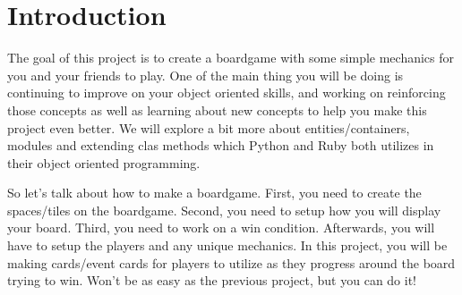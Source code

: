 \documentclass{42-en}
\begin{document}

\chapter{Introduction}

	The goal of this project is to create a boardgame with some simple mechanics
	for you and your friends to play. One of the main thing you will be doing is
	continuing to improve on your object oriented skills, and working on reinforcing
	those concepts as well as learning about new concepts to help you make this
	project even better. We will explore a bit more about entities/containers,
	modules and extending clas methods which Python and Ruby both utilizes
	in their object oriented programming.\\



	So let's talk about how to make a boardgame. First, you need to create the
	spaces/tiles on the boardgame. Second, you need to setup how you will display
	your board. Third, you need to work on a win condition. Afterwards, you will
	have to setup the players and any unique mechanics. In this project, you will
	be making cards/event cards for players to utilize as they progress around the
	board trying to win. Won't be as easy as the previous project, but you can do it!\\



\end{document}
